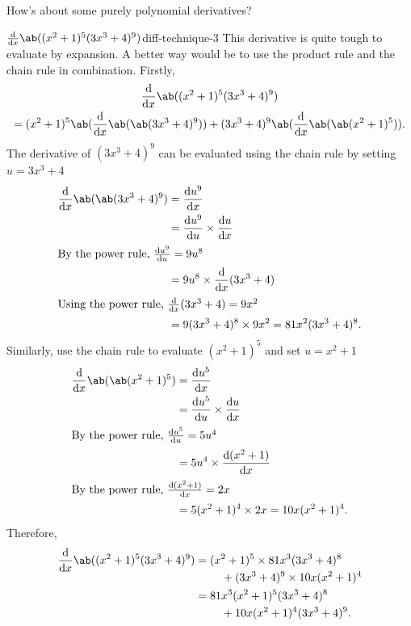 How's about some purely polynomial derivatives?
\begin{exmp}{$\odv*{\ab((x^2 + 1)^5(3x^3 + 4)^9)}{x}$}{diff-technique-3}
  This derivative is quite tough to evaluate by expansion. A better way would be to use the product rule and the chain rule in combination. Firstly,
  \begin{multline}
    \odv*{\ab((x^2 + 1)^5(3x^3 + 4)^9)}{x} \\
    = (x^2 + 1)^5\ab(\odv*{\ab(\ab(3x^3 + 4)^9)}{x}) + (3x^3 + 4)^9\ab(\odv*{\ab(\ab(x^2 + 1)^5)}{x}).
  \end{multline}
  The derivative of $(3x^3 + 4)^9$ can be evaluated using the chain rule by setting $u = 3x^3 + 4$
  \begin{align}
    \odv*{\ab(\ab(3x^3 + 4)^9)}{x} & = \odv{u^9}{x}                                    \\
                                   & = \odv{u^9}{u} \times \odv{u}{x}                  \\
    \intertext{By the power rule, $\odv{u^9}{u} = 9u^8$}
                                   & = 9u^8 \times \odv*{(3x^3 + 4)}{x}                \\
    \intertext{Using the power rule, $\odv*{(3x^3 + 4)}{x} = 9x^2$}
                                   & = 9(3x^3 + 4)^8 \times 9x^2 = 81x^2(3x^3 + 4)^8.
  \end{align}
  Similarly, use the chain rule to evaluate $(x^2 + 1)^5$ and set $u = x^2 + 1$
  \begin{align}
    \odv*{\ab(\ab(x^2 + 1)^5)}{x} & = \odv{u^5}{x}                              \\
                                  & = \odv{u^5}{u} \times \odv{u}{x}            \\
    \intertext{By the power rule, $\odv{u^5}{u} = 5u^4$}
                                  & = 5u^4 \times \odv{(x^2 + 1)}{x}            \\
    \intertext{By the power rule, $\odv{(x^2 + 1)}{x} = 2x$}
                                  & = 5(x^2 + 1)^4 \times 2x = 10x(x^2 + 1)^4.
  \end{align}
  Therefore,
  \begin{align}
    \odv*{\ab((x^2 + 1)^5(3x^3 + 4)^9)}{x} & =
    \begin{multlined}[t]
      (x^2 + 1)^5\times 81x^3(3x^3 + 4)^8 \\+ (3x^3 + 4)^9 \times 10x(x^2 + 1)^4
    \end{multlined} \\
                                           & = 
    \begin{multlined}[t]
      81x^3(x^2 + 1)^5(3x^3 + 4)^8 \\+ 10x(x^2 + 1)^4(3x^3 + 4)^9.
    \end{multlined}
  \end{align}
\end{exmp}

